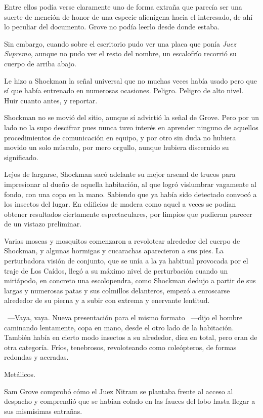 Entre ellos podía verse claramente uno de forma extraña que parecía ser una suerte de mención de honor de una especie alienígena hacia el interesado, de ahí lo peculiar del documento. Grove no podía leerlo desde donde estaba.

Sin embargo, cuando sobre el escritorio pudo ver una placa que ponía \emph{Juez Supremo}, aunque no pudo ver el resto del nombre, un escalofrío recorrió su cuerpo de arriba abajo.

Le hizo a Shockman la señal universal que no muchas veces había usado pero que sí que había entrenado en numerosas ocasiones. Peligro. Peligro de alto nivel. Huir cuanto antes, y reportar.

Shockman no se movió del sitio, aunque sí advirtió la señal de Grove. Pero por un lado no la supo descifrar pues nunca tuvo interés en aprender ninguno de aquellos procedimientos de comunicación en equipo, y por otro sin duda no hubiera movido un solo músculo, por mero orgullo, aunque hubiera discernido su significado.

Lejos de largarse, Shockman sacó adelante su mejor arsenal de trucos para impresionar al dueño de aquella habitación, al que logró vislumbrar vagamente al fondo, con una copa en la mano. Sabiendo que ya había sido detectado convocó a los insectos del lugar. En edificios de madera como aquel a veces se podían obtener resultados ciertamente espectaculares, por limpios que pudieran parecer de un vistazo preliminar.

Varias moscas y mosquitos comenzaron a revolotear alrededor del cuerpo de Shockman, y algunas hormigas y cucarachas aparecieron a sus pies. La perturbadora visión de conjunto, que se unía a la ya habitual provocada por el traje de Los Caídos, llegó a su máximo nivel de perturbación cuando un miriápodo, en concreto una escolopendra, como Shockman dedujo a partir de sus largas y numerosas patas y sus colmillos delanteros, empezó a enroscarse alrededor de su pierna y a subir con extrema y enervante lentitud.

~---Vaya, vaya. Nueva presentación para el mismo formato ~---dijo el hombre caminando lentamente, copa en mano, desde el otro lado de la habitación. También había en cierto modo insectos a su alrededor, diez en total, pero eran de otra categoría. Fríos, tenebrosos, revoloteando como coleópteros, de formas redondas y aceradas.

Metálicos.

Sam Grove comprobó cómo el Juez Nitram se plantaba frente al acceso al despacho y comprendió que se habían colado en las fauces del lobo hasta llegar a sus mismísimas entrañas.
